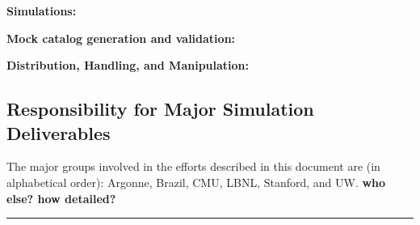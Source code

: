 {\bf Simulations:} 

{\bf Mock catalog generation and validation:}

{\bf Distribution, Handling, and Manipulation:}

\subsection{Responsibility for Major Simulation Deliverables}

The major groups involved in the efforts described in this document are (in alphabetical order): Argonne, Brazil, CMU, LBNL, Stanford, and UW. {\bf who else? how detailed?}  


\vspace{\baselineskip}
\hrule
\clearpage
